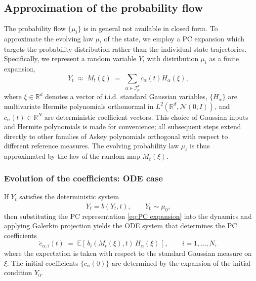 \documentclass[11pt, a4paper, oneside, reqno]{amsart}
\begin{document}
\subsection{Approximation of the probability flow}
\noindent The probability flow $\{\mu_t\}$ is in general not available in closed form. To approximate the evolving law $\mu_t$ of the state, we employ a PC expansion which targets the probability distribution rather than the individual state trajectories. 
Specifically, we represent a random variable $Y_t$ with distribution $\mu_t$ as a finite expansion,
\begin{equation}\label{eq:PC expansion}
Y_t \;\approx\; M_t(\xi) \;=\; \sum_{\alpha\in\mathcal{I}_p^d} c_{\alpha}(t) H_\alpha(\xi),
\end{equation}
where $\xi\in\mathbb{R}^d$ denotes a vector of i.i.d. standard Gaussian variables, $\{H_\alpha\}$ are multivariate Hermite polynomials orthonormal in $L^2(\mathbb{R}^d,\mathcal{N}(0,I))$, and $c_\alpha(t)\in\mathbb{R}^N$ are deterministic coefficient vectors.  This choice of Gaussian inputs and Hermite polynomials is made for convenience; all subsequent steps extend directly to other families of Askey polynomials orthogonal with respect to different reference measures.  
The evolving probability law $\mu_t$ is thus approximated by the law of the random map $M_t(\xi)$.  
\subsubsection{Evolution of the coefficients: ODE case}
\noindent If $Y_t$ satisfies the deterministic system
\[
\dot{Y}_t = b(Y_t,t), \qquad Y_0\sim \mu_0,
\]
then substituting the PC representation \eqref{eq:PC expansion} into the dynamics and applying Galerkin projection yields the ODE system that determines the PC coefficients
\begin{equation}\label{eq:coeff evolution ODE}
\dot{c}_{\alpha,i}(t) \;=\; \mathbb{E}\left[\, b_i(M_t(\xi),t) \, H_\alpha(\xi)\,\right],
\qquad i=1,\dots,N,
\end{equation}
where the expectation is taken with respect to the standard Gaussian measure on $\xi$.  
The initial coefficients $\{c_\alpha(0)\}$ are determined by the expansion of the initial condition $Y_0$.
\end{document}
